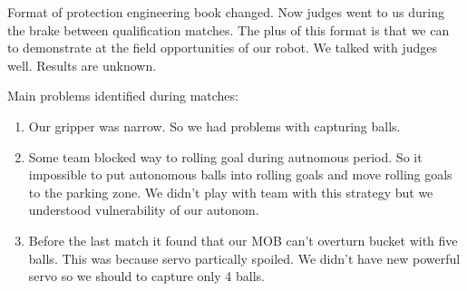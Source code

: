 Format of protection engineering book changed. Now judges went to us during the brake between qualification matches. The plus of this format is that we can to demonstrate at the field opportunities of our robot. We talked with judges well. Results are unknown.\newline

Main problems identified during matches:
\begin{enumerate}
	\item Our gripper was narrow. So we had problems with capturing balls. 
	
	\item Some team blocked way to rolling goal during autnomous period. So it impossible to put autonomous balls into rolling goals and move rolling goals to the parking zone. We didn't play with team with this strategy but we understood vulnerability of our autonom.
	
	\item Before the last match it found that our MOB can't overturn bucket with five balls. This was because servo partically spoiled. We didn't have new powerful servo so we should to capture only 4 balls.
	
\end{enumerate} 

\fillpage